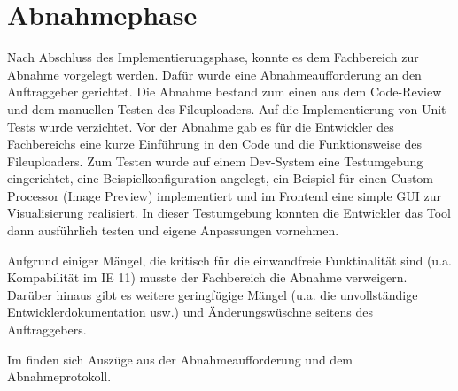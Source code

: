 \section{Abnahmephase} 
\label{sec:Abnahmephase}

Nach Abschluss des Implementierungsphase, konnte es dem Fachbereich zur Abnahme vorgelegt werden. Dafür wurde eine Abnahmeaufforderung an den Auftraggeber gerichtet. Die Abnahme bestand zum einen aus dem Code-Review und dem manuellen Testen des Fileuploaders. Auf die Implementierung von Unit Tests wurde verzichtet. Vor der Abnahme gab es für die Entwickler des Fachbereichs eine kurze Einführung in den Code und die Funktionsweise des Fileuploaders. Zum Testen wurde auf einem Dev-System eine Testumgebung eingerichtet, eine Beispielkonfiguration angelegt, ein Beispiel für einen Custom-Processor (Image Preview) implementiert und im Frontend eine simple GUI zur Visualisierung realisiert. In dieser Testumgebung konnten die Entwickler das Tool dann ausführlich testen und eigene Anpassungen vornehmen.

Aufgrund einiger Mängel, die kritisch für die einwandfreie Funktinalität sind (u.a. Kompabilität im IE 11) musste der Fachbereich die Abnahme verweigern. Darüber hinaus gibt es weitere geringfügige Mängel (u.a. die unvollständige Entwicklerdokumentation usw.) und Änderungswüschne seitens des Auftraggebers.

Im  finden sich Auszüge aus der Abnahmeaufforderung und dem Abnahmeprotokoll.